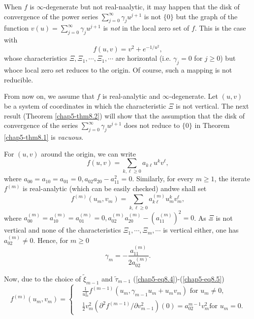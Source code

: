 \begin{remark}\label{chap5-rem8.3}
When $f$ is $\infty$-degenerate but not real-naalytic, it may happen
that the disk of convergence of the power series
$\sum\limits_{j=0}^{\infty} \gamma_{j} u^{j+1}$ is not $\{0\}$ but the
graph of the function $v(u) = \sum\limits_{j=0}^{\infty} \gamma_{j}
u^{j+1}$ is {\em not} in the local zero set of $f$. This is the case
with
$$
f(u, v) = v^{2} + e^{-1/u^{2}},
$$
whose characteristics $\Xi, \Xi_{1}, \cdots, \Xi_{1}, \cdots$ are
horizontal (i.e. $\gamma_{j} = 0$ for $j \geq 0$) but whoce local
zero set reduces to the origin. Of course, such a mapping is not reducible.
\end{remark}

From now on, we assume that $f$ is real-analytic and
$\infty$-degenerate. Let $(u, v)$ be a system of coordinates in which
the characteristic $\Xi$ is not vertical. The next result (Theorem
\ref{chap5-thm8.2}) will show that the assumption that the disk of
convergence of the series $\sum\limits_{j=0}^{\infty} \gamma_{j}
u^{j+1}$ does not reduce to $\{0\}$ in Theorem \ref{chap5-thm8.1} is
{\em vacuous}.

For $(u, v)$ around the origin, we can write
\begin{equation*}
f(u, v) = \sum\limits_{k, \ell \geq 0} a_{k\ell} u^{k} v^{\ell},\tag{8.16}\label{chap5-eq8.16}
\end{equation*}
where $a_{00} = a_{10} = a_{01} = 0, a_{02} a_{20} - a_{11}^{2} =
0$. Similarly, for every $m \geq 1$, the iterate $f^{(m)}$ is
real-analytic (which can be easily checked) and\pageoriginale we shall set
\begin{equation*}
f^{(m)} (u_{m}, v_{m}) = \sum_{k, \ell \geq 0} a_{k\ell}^{(m)}
u_{m}^{k} v_{m}^{\ell},\tag{8.17}\label{chap5-eq8.17}
\end{equation*}
where $a_{00}^{(m)} = a_{10}^{(m)} = a_{01}^{(m)} = 0, a_{02}^{(m)}
a_{20}^{(m)}  - (a_{11}^{(m)})^{2} = 0$. As $\Xi$ is not vertical and
none of the characteristics $\Xi_{1}, \cdots, \Xi_{m}, \cdots$ is
vertical either, one has $a_{02}^{(m)} \neq 0$. Hence, for $m \geq 0$
$$
\gamma_{m} = - \frac{a_{11}^{(m)}}{2a_{02}^{(m)}}.
$$

Now, due to the choice of $\widetilde{\xi}_{m-1}$ and
$\widetilde{\tau}_{m-1}$ (\ref{chap5-eq8.4})-(\ref{chap5-eq8.5})
\begin{equation*}
f^{(m)} (u_{m}, v_{m}) = 
\begin{cases}
& \frac{1}{u_{m}^{2}} f^{(m-1)} (u_{m}, \gamma_{m-1} u_{m} + u_{m}
v_{m}) \text{ for } u_{m} \neq 0,\\
& \frac{1}{2} v_{m}^{2} (\partial^{2} f^{(m-1)} / \partial
v_{m-1}^{2}) (0) = a_{02}^{m-1} v_{m}^{2} \text{for } u_{m} =
0.
\end{cases}\tag{8.18}\label{chap5-eq8.18} 
\end{equation*}


